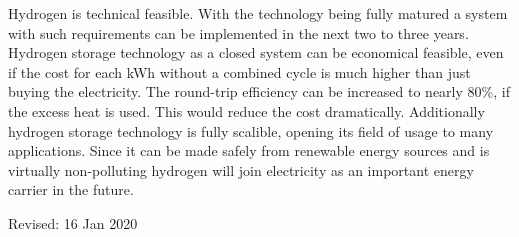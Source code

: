 \begin{parcolumns}[colwidths={1=2.5 cm, 2=10 cm, 3=2.5cm}]{3}
{Hydrogen is technical feasible. With the technology being fully matured a system with such requirements can be implemented in the next two to three years. \\


Hydrogen storage technology as a closed system can be economical feasible, even if the cost for each kWh without a combined cycle is much higher than just buying the electricity. The round-trip efficiency can be increased to nearly 80\%, if the excess heat is used. This would reduce the cost dramatically. Additionally hydrogen storage technology is fully scalible, opening its field of usage to many applications. Since it can be made safely from renewable energy sources and is virtually non-polluting hydrogen will join electricity as an important energy carrier in the future.
}


\end{parcolumns}
\begin{flushright}
Revised: 16 Jan 2020
\end{flushright}
\clearpage
\cfoot{}
